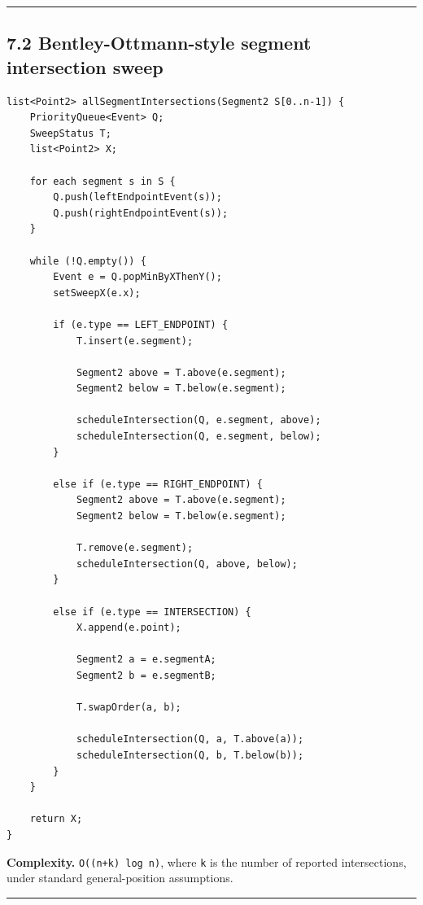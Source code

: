 \documentclass[11pt]{article}
\begin{document}
\begin{center}\rule{0.5\linewidth}{0.5pt}\end{center}

\subsection{7.2 Bentley-Ottmann-style segment intersection
sweep}\label{bentley-ottmann-style-segment-intersection-sweep}

\begin{verbatim}
list<Point2> allSegmentIntersections(Segment2 S[0..n-1]) {
    PriorityQueue<Event> Q;
    SweepStatus T;
    list<Point2> X;

    for each segment s in S {
        Q.push(leftEndpointEvent(s));
        Q.push(rightEndpointEvent(s));
    }

    while (!Q.empty()) {
        Event e = Q.popMinByXThenY();
        setSweepX(e.x);

        if (e.type == LEFT_ENDPOINT) {
            T.insert(e.segment);

            Segment2 above = T.above(e.segment);
            Segment2 below = T.below(e.segment);

            scheduleIntersection(Q, e.segment, above);
            scheduleIntersection(Q, e.segment, below);
        }

        else if (e.type == RIGHT_ENDPOINT) {
            Segment2 above = T.above(e.segment);
            Segment2 below = T.below(e.segment);

            T.remove(e.segment);
            scheduleIntersection(Q, above, below);
        }

        else if (e.type == INTERSECTION) {
            X.append(e.point);

            Segment2 a = e.segmentA;
            Segment2 b = e.segmentB;

            T.swapOrder(a, b);

            scheduleIntersection(Q, a, T.above(a));
            scheduleIntersection(Q, b, T.below(b));
        }
    }

    return X;
}
\end{verbatim}

\textbf{Complexity.} \texttt{O((n+k) log n)}, where
\texttt{k} is the number of reported intersections,
under standard general-position assumptions.

\begin{center}\rule{0.5\linewidth}{0.5pt}\end{center}
\end{document}
